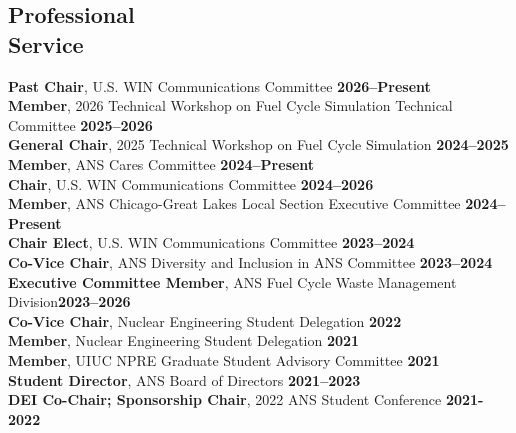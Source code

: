 \documentclass[margin,line]{resume}
\begin{document}
\begin{resume}
    \section{\mysidestyle Professional\\Service}
        \textbf{Past Chair}, U.S. WIN Communications Committee \hfill \textbf{2026--Present}\\
        \textbf{Member}, 2026 Technical Workshop on Fuel Cycle Simulation Technical Committee \hfill \textbf{2025--2026}\\
        \textbf{General Chair}, 2025 Technical Workshop on Fuel Cycle Simulation \hfill \textbf{2024--2025}\\
        \textbf{Member}, ANS Cares Committee \hfill \textbf{2024--Present} \\
        \textbf{Chair}, U.S. WIN Communications Committee \hfill \textbf{2024--2026} \\
        \textbf{Member}, ANS Chicago-Great Lakes Local Section Executive Committee \hfill \textbf{2024--Present}\vspace{0.5mm}\\
        \textbf{Chair Elect}, U.S. WIN Communications Committee \hfill \textbf{2023--2024}\vspace{0.5mm}\\
        \textbf{Co-Vice Chair}, ANS Diversity and Inclusion in ANS Committee \hfill \textbf{2023--2024}\vspace{0.5mm}\\
        \textbf{Executive Committee Member}, ANS Fuel Cycle Waste Management Division\hfill \textbf{2023--2026}\vspace{0.5mm}\\
        \textbf{Co-Vice Chair}, Nuclear Engineering Student Delegation \hfill \textbf{2022}\vspace{0.5mm}\\
        \textbf{Member}, Nuclear Engineering Student Delegation \hfill \textbf{2021}\vspace{0.5mm}\\
        \textbf{Member}, UIUC NPRE Graduate Student Advisory Committee \hfill \textbf{2021}\vspace{0.5mm}\\
        \textbf{Student Director}, ANS Board of Directors \hfill \textbf{2021--2023}\vspace{.5mm}\\
        \textbf{DEI Co-Chair; Sponsorship Chair}, 2022 ANS Student Conference  \hfill \textbf{2021-2022}\vspace{0.5mm}\\

\end{resume}
\end{document}
